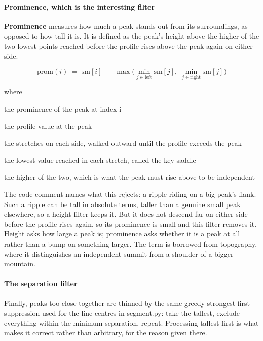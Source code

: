 \paragraph{Prominence, which is the interesting filter}
\textbf{Prominence} measures how much a peak stands out from its surroundings, as opposed to how tall it is. It is defined as the peak's height above the higher of the two lowest points reached before the profile rises above the peak again on either side.


\begin{equation}
\mathrm{prom}(i) \;=\; \mathrm{sm}[i] \;-\; \max\big(\min_{j \in \mathrm{left}} \mathrm{sm}[j],\; \min_{j \in \mathrm{right}} \mathrm{sm}[j]\big)
\end{equation}

\noindent where
\begin{description}[leftmargin=2.4em,style=nextline,font=\normalfont\ttfamily]\setlength\itemsep{1pt}
  \item[{$\mathrm{prom}(i)$}] \normalfont the prominence of the peak at index i
  \item[{$\mathrm{sm}[i]$}] \normalfont the profile value at the peak
  \item[{$\mathrm{left},\, \mathrm{right}$}] \normalfont the stretches on each side, walked outward until the profile exceeds the peak
  \item[{$\min$}] \normalfont the lowest value reached in each stretch, called the key saddle
  \item[{$\max$}] \normalfont the higher of the two, which is what the peak must rise above to be independent
\end{description}
The code comment names what this rejects: a ripple riding on a big peak's flank. Such a ripple can be tall in absolute terms, taller than a genuine small peak elsewhere, so a height filter keeps it. But it does not descend far on either side before the profile rises again, so its prominence is small and this filter removes it. Height asks how large a peak is; prominence asks whether it is a peak at all rather than a bump on something larger. The term is borrowed from topography, where it distinguishes an independent summit from a shoulder of a bigger mountain.


\paragraph{The separation filter}
Finally, peaks too close together are thinned by the same greedy strongest-first suppression used for the line centres in segment.py: take the tallest, exclude everything within the minimum separation, repeat. Processing tallest first is what makes it correct rather than arbitrary, for the reason given there.


